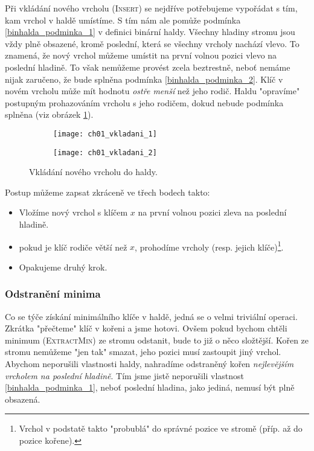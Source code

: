 Při vkládání nového vrcholu (\textsc{Insert}) se nejdříve potřebujeme vypořádat s tím, kam vrchol v haldě umístíme. S tím nám ale pomůže podmínka \ref{binhalda_podminka_1} v definici binární haldy. Všechny hladiny stromu jsou vždy plně obsazené, kromě poslední, která se všechny vrcholy nachází vlevo. To znamená, že nový vrchol můžeme umístit na první volnou pozici vlevo na poslední hladině. To však nemůžeme provést zcela beztrestně, neboť nemáme nijak zaručeno, že bude splněna podmínka \ref{binhalda_podminka_2}. Klíč v novém vrcholu může mít hodnotu \emph{ostře menší} než jeho rodič. Haldu "opravíme" postupným prohazováním vrcholu s jeho rodičem, dokud nebude podmínka splněna (viz obrázek \ref{fig:vkladani_vrcholu_halda}).
\begin{figure}[h]
    \centering
    \begin{subfigure}{7cm}
        \texttt{[image: ch01\_vkladani\_1]}
    \end{subfigure}
    \begin{subfigure}{7cm}
        \texttt{[image: ch01\_vkladani\_2]}
    \end{subfigure}
    \caption{Vkládání nového vrcholu do haldy.}
    \label{fig:vkladani_vrcholu_halda}
\end{figure}
Postup můžeme zapsat zkráceně ve třech bodech takto:
\begin{itemize}
    \item Vložíme nový vrchol s klíčem $x$ na první volnou pozici zleva na poslední hladině.
    \item pokud je klíč rodiče větší než $x$, prohodíme vrcholy (resp. jejich klíče)\footnote{Vrchol v podstatě takto "probublá" do správné pozice ve stromě (příp. až do pozice kořene).}.
    \item Opakujeme druhý krok.
\end{itemize}

\subsubsection{Odstranění minima}

Co se týče získání minimálního klíče v haldě, jedná se o velmi triviální operaci. Zkrátka "přečteme" klíč v kořeni a jsme hotovi. Ovšem pokud bychom chtěli minimum (\textsc{ExtractMin}) ze stromu odstanit, bude to již o něco složtější. Kořen ze stromu nemůžeme "jen tak" smazat, jeho pozici musí zastoupit jiný vrchol. Abychom neporušili vlastnosti haldy, nahradíme odstraněný kořen \emph{nejlevějším vrcholem na poslední hladině}. Tím jsme jistě neporušili vlastnost \ref{binhalda_podminka_1}, neboť poslední hladina, jako jediná, nemusí být plně obsazená.

